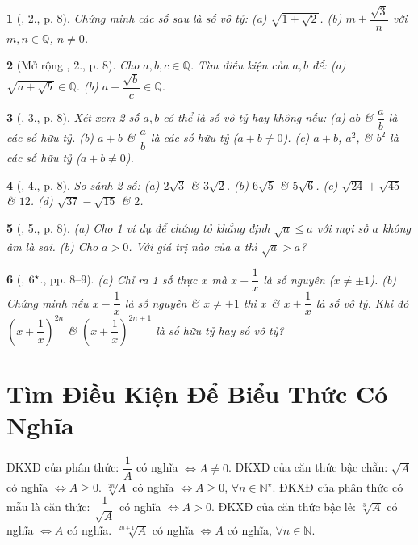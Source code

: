 \documentclass{article}
\newtheorem{baitoan}{}%
\begin{document}
\begin{baitoan}[\cite{Binh_Toan_9_tap_1}, 2., p. 8]
	Chứng minh các số sau là số vô tỷ: (a) $\sqrt{1 + \sqrt{2}}$. (b) $m + \dfrac{\sqrt{3}}{n}$ với $m,n\in\mathbb{Q}$, $n\ne0$.
\end{baitoan}

\begin{baitoan}[Mở rộng \cite{Binh_Toan_9_tap_1}, 2., p. 8]
	Cho $a,b,c\in\mathbb{Q}$. Tìm điều kiện của $a,b$ để: (a) $\sqrt{a + \sqrt{b}}\in\mathbb{Q}$. (b) $a + \dfrac{\sqrt{b}}{c}\in\mathbb{Q}$.
\end{baitoan}

\begin{baitoan}[\cite{Binh_Toan_9_tap_1}, 3., p. 8]
	Xét xem 2 số $a,b$ có thể là số vô tỷ hay không nếu: (a) $ab$ \& $\dfrac{a}{b}$ là các số hữu tỷ. (b) $a + b$ \& $\dfrac{a}{b}$ là các số hữu tỷ ($a + b\ne0$). (c) $a + b$, $a^2$, \& $b^2$ là các số hữu tỷ ($a + b\ne0$).
\end{baitoan}

\begin{baitoan}[\cite{Binh_Toan_9_tap_1}, 4., p. 8]
	So sánh 2 số: (a) $2\sqrt{3}$ \& $3\sqrt{2}$. (b) $6\sqrt{5}$ \& $5\sqrt{6}$. (c) $\sqrt{24} + \sqrt{45}$ \& $12$. (d) $\sqrt{37} - \sqrt{15}$ \& $2$.
\end{baitoan}

\begin{baitoan}[\cite{Binh_Toan_9_tap_1}, 5., p. 8]
	(a) Cho 1 ví dụ để chứng tỏ khẳng định $\sqrt{a}\le a$ với mọi số $a$ không âm là sai. (b) Cho $a > 0$. Với giá trị nào của $a$ thì $\sqrt{a} > a$?
\end{baitoan}

\begin{baitoan}[\cite{Binh_Toan_9_tap_1}, $\rm6^\star$., pp. 8--9]
	(a) Chỉ ra 1 số thực $x$ mà $x - \dfrac{1}{x}$ là số nguyên ($x\ne\pm1$). (b) Chứng minh nếu $x - \dfrac{1}{x}$ là số nguyên \& $x\ne\pm1$ thì $x$ \& $x + \dfrac{1}{x}$ là số vô tỷ. Khi đó $\left(x + \dfrac{1}{x}\right)^{2n}$ \& $\left(x + \dfrac{1}{x}\right)^{2n+1}$ là số hữu tỷ hay số vô tỷ?
\end{baitoan}


\section{Tìm Điều Kiện Để Biểu Thức Có Nghĩa}
 {\sf ĐKXĐ của phân thức}: $\dfrac{1}{A}$ có nghĩa $\Leftrightarrow A\ne0$.  {\sf ĐKXĐ của căn thức bậc chẵn}: $\sqrt{A}$ có nghĩa $\Leftrightarrow A\ge0$. $\sqrt[2n]{A}$ có nghĩa $\Leftrightarrow A\ge0$, $\forall n\in\mathbb{N}^\star$.  {\sf ĐKXĐ của phân thức có mẫu là căn thức}: $\dfrac{1}{\sqrt{A}}$ có nghĩa $\Leftrightarrow A > 0$.  {\sf ĐKXĐ của căn thức bậc lẻ}: $\sqrt[3]{A}$ có nghĩa $\Leftrightarrow A$ có nghĩa. $\sqrt[2n + 1]{A}$ có nghĩa $\Leftrightarrow A$ có nghĩa, $\forall n\in\mathbb{N}$.
\end{document}
